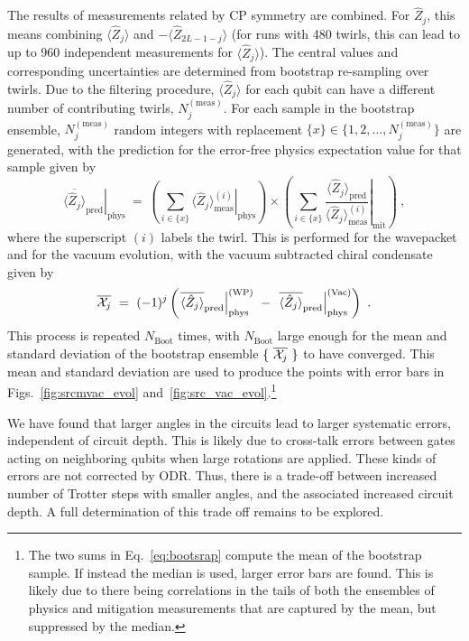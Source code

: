 \documentclass[aps, prc, tightenlines,superscriptaddress, letterpaper, amsmath, amssymb, preprintnumbers, floatfix, longbibliography, nofootinbib]{revtex4-2}
\begin{document}
The results of measurements related by CP symmetry are combined.
For $\hat{Z}_j$, this means combining $\langle \hat{Z}_j \rangle$ and $-\langle \hat{Z}_{2L-1-j} \rangle$ (for runs with 480 twirls, this can lead to up to 960 independent measurements for $\langle \hat{Z}_j \rangle$).
The central values and corresponding uncertainties are determined from bootstrap re-sampling over twirls. 
Due to the filtering  procedure, $\langle \hat{Z}_j\rangle$ for each qubit can have a different number of contributing twirls, $N^{(\text{meas})}_j$.
For each sample in the bootstrap ensemble, $N^{(\text{meas})}_j$ random integers with replacement $\{ x \} \in \{1,2,\ldots, N^{(\text{meas})}_j\}$ are generated, with the prediction for the error-free physics expectation value for that sample given by
%
\begin{equation}
\left.{\overline{\langle \hat{Z}_j \rangle}_{\text{pred}}}\right\rvert_{\text{phys}} \ = \ \left( \sum_{i \in \{ x \}} \left.{\langle \hat{Z}_j \rangle^{(i)}_{\text{meas}}} \right\rvert_{\text{phys}} \right) \times  \left ( \sum_{i \in \{ x \}} \left . \frac{\langle \hat{Z}_j \rangle_{\text{pred}}}{\langle \hat{Z}_j \rangle^{(i)}_{\text{meas}}}\right \rvert_{\text{mit}} \right )\ ,
\label{eq:bootsrap}
\end{equation}
%
where the superscript $(i)$ labels the twirl.
This is performed for the wavepacket and for the vacuum evolution, with the vacuum subtracted chiral condensate given by
%
\begin{equation}
\overline{ {\cal X}_j } \ = \ (-1)^j \left ( \left.\overline{\langle \hat{Z}_j \rangle}_{\text{pred}} \right\rvert_{\text{phys}}^{(\text{WP})} \ - \ \left. \overline{\langle \hat{Z}_j \rangle}_{\text{pred}} \right\rvert_{\text{phys}}^{(\text{Vac})}  \right ) \ .
\end{equation}
%
This process is repeated $N_{\text{Boot}}$ times, with $N_{\text{Boot}}$ large enough for the mean and standard deviation of the bootstrap ensemble $\{ \ \overline{ {\cal X}_j }\ \}$ to have converged.
This mean and standard deviation are used to produce the points with error bars in Figs.~\ref{fig:srcmvac_evol} and~\ref{fig:src_vac_evol}.\footnote{The two sums in Eq.~\eqref{eq:bootsrap} compute the mean of the bootstrap sample. 
If instead the median is used, larger error bars are found.
This is likely due to there being correlations in the tails of both the ensembles of physics and mitigation measurements that are captured by the mean, but suppressed 
by the median.}

We have found that larger angles in the circuits lead to larger systematic errors, independent of circuit depth.
This is likely due to cross-talk errors between gates acting on neighboring qubits when large rotations are applied.
These kinds of errors are not corrected by ODR.
Thus, there is a trade-off between increased number of Trotter steps with smaller angles, and the associated increased circuit depth.
A full determination of this trade off remains to be explored.
\end{document}
